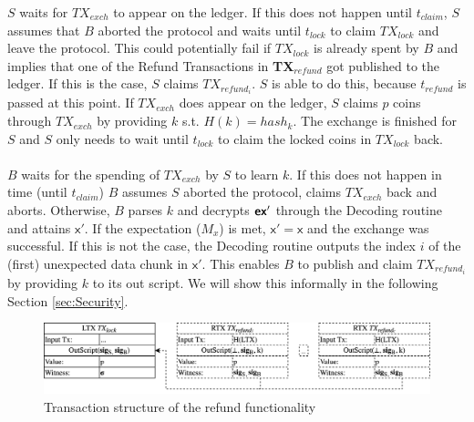 \documentclass{cacthesis}
\newcounter{protocol}
\begin{document}
        $S$ waits for $TX_{exch}$ to appear on the ledger. If this does not happen until $t_{claim}$, $S$ assumes that $B$ aborted the protocol and waits until $t_{lock}$ to claim $TX_{lock}$ and leave the protocol. This could potentially fail if $TX_{lock}$ is already spent by $B$ and implies that one of the Refund Transactions in \textbf{TX$_{{refund}}$} got published to the ledger. If this is the case, $S$ claims $TX_{{refund}_i}$. $S$ is able to do this, because $t_{refund}$ is passed at this point. If $TX_{exch}$ does appear on the ledger, $S$ claims $p$ coins through $TX_{exch}$ by providing $k$ s.t. $H(k) = hash_k$. The exchange is finished for $S$ and $S$ only needs to wait until $t_{lock}$ to claim the locked coins in $TX_{lock}$ back. \\\\
        $B$ waits for the spending of $TX_{exch}$ by $S$ to learn $k$. If this does not happen in time (until $t_{claim}$) $B$ assumes $S$ aborted the protocol, claims $TX_{exch}$ back and aborts. Otherwise, $B$ parses $k$ and decrypts $\textsf{\textbf{ex}}'$ through the \textsf{Decoding} routine and attains $\textsf{x}'$. If the expectation ($M_x$) is met, $\textsf{x}' = \textsf{x}$ and the exchange was successful. If this is not the case, the \textsf{Decoding} routine outputs the index $i$ of the (first) unexpected data chunk in $\textsf{x}'$. This enables $B$ to publish and claim $TX_{{refund}_i}$ by providing $k$ to its out script. We will show this informally in the following Section \ref{sec:Security}. 


        
        
        \begin{figure}
            \begin{center}
                \includegraphics[width=\textwidth]{images/locking_refund_tx_figure.png}
              \caption{Transaction structure of the refund functionality}
              \label{fig:lockingRefundTx}
            \end{center}
            \end{figure}
            
\end{document}
